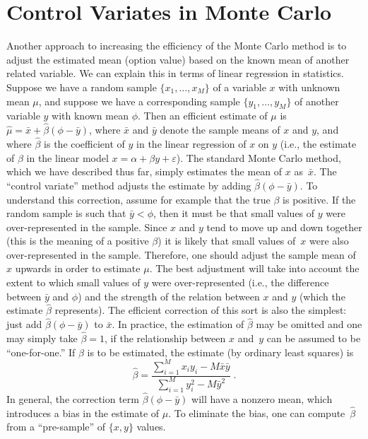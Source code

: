 \section{Control Variates in Monte Carlo}\label{s_controlvariates}
Another approach to increasing the efficiency of the Monte Carlo method is to adjust the estimated mean (option value) based on the known mean of another related variable.  We can explain this in terms of linear regression in statistics.  Suppose we have a random sample $\{x_1,\ldots,x_M\}$ of a variable $x$ with unknown mean $\mu$, and suppose we have a corresponding sample $\{y_1,\ldots,y_M\}$ of another variable $y$ with known mean $\phi$.  Then an efficient estimate of $\mu$ is $\hat{\mu} = \bar{x} + \hat{\beta} (\phi-\bar{y})$, where $\bar{x}$ and $\bar{y}$ denote the sample means of $x$ and $y$, and where $\hat{\beta}$ is the coefficient of $y$ in the linear regression of $x$ on $y$ (i.e., the estimate of $\beta$ in the linear model $x = \alpha +\beta y + \varepsilon$).  The standard Monte Carlo method, which we have described thus far, simply estimates the mean of $x$ as~$\bar{x}$.  The ``control variate'' method adjusts the estimate by adding $\hat{\beta} (\phi-\bar{y})$.  To understand this correction, assume for example that the true $\beta$ is positive.  If the random sample is such that $\bar{y}<\phi$, then it must be that small values of $y$ were over-represented in the sample.  Since $x$ and $y$ tend to move up and down together (this is the meaning of a positive $\beta$) it is likely that small values of~$x$ were also over-represented in the sample.  Therefore, one should adjust the sample mean of $x$ upwards in order to estimate $\mu$.  The best adjustment will take into account the extent to which small values of $y$ were over-represented (i.e., the difference between $\bar{y}$ and $\phi$) and the strength of the relation between $x$ and $y$ (which the estimate $\hat{\beta}$ represents).  The efficient correction of this sort is also the simplest:  just add $\hat{\beta}(\phi-\bar{y})$ to $\bar{x}$.  In practice, the estimation of $\hat{\beta}$ may be omitted and one may simply take $\hat{\beta}=1$, if the relationship between $x$ and~$y$ can be assumed to be ``one-for-one.''  If $\beta$ is to be estimated, the estimate (by ordinary least squares) is
$$\hat{\beta} = \frac{\sum_{i=1}^M x_iy_i - M\bar{x}\bar{y}}{\sum_{i=1}^M y_i^2 - M\bar{y}^2}\; .$$
In general, the correction term $\hat{\beta}(\phi-\bar{y})$ will have a nonzero mean, which introduces a bias in the estimate of $\mu$.  To eliminate the bias, one can compute~$\hat{\beta}$ from a ``pre-sample'' of $\{x,y\}$ values.  

